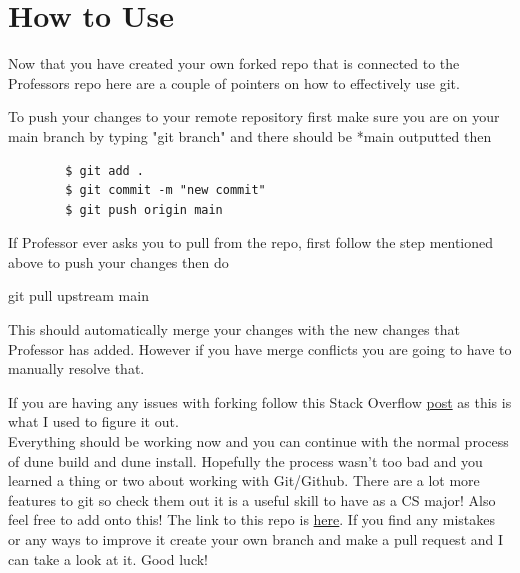 \documentclass{article}
\newcommand{\SubItem}[1]{
    {\setlength\itemindent{15pt} \item[-] #1}
}
\begin{document}
\section{How to Use}
Now that you have created your own forked repo that is connected to the Professors repo here are a couple of pointers on how to effectively use git.
\begin{itemize}
    \item To push your changes to your remote repository first make sure you are on your main branch by typing "git branch" and there should be *main outputted then
    \begin{verbatim}
        $ git add .
        $ git commit -m "new commit"
        $ git push origin main 
    \end{verbatim}
    \item If Professor ever asks you to pull from the repo, first follow the step mentioned above to push your changes then do
        \SubItem{git pull upstream main}
        \SubItem{This should automatically merge your changes with the new changes that Professor has added. However if you have merge conflicts you are going to have to manually resolve that.}
\end{itemize}

\noindent
If you are having any issues with forking follow this Stack Overflow \href{https://stackoverflow.com/questions/3903817/pull-new-updates-from-original-github-repository-into-forked-github-repository}{post} as this is what I used to figure it out. \\

\noindent
Everything should be working now and you can continue with the normal process of dune build and dune install. Hopefully the process wasn't too bad and you learned a thing or two about working with Git/Github. There are a lot more features to git so check them out it is a useful skill to have as a CS major!
Also feel free to add onto this! The link to this repo is \href{https://github.com/shadagali03/How_To_Github_PLaF}{here}. If you find any mistakes or any ways to improve it create your own branch and make a pull request and I can take a look at it. Good luck!
\end{document}
